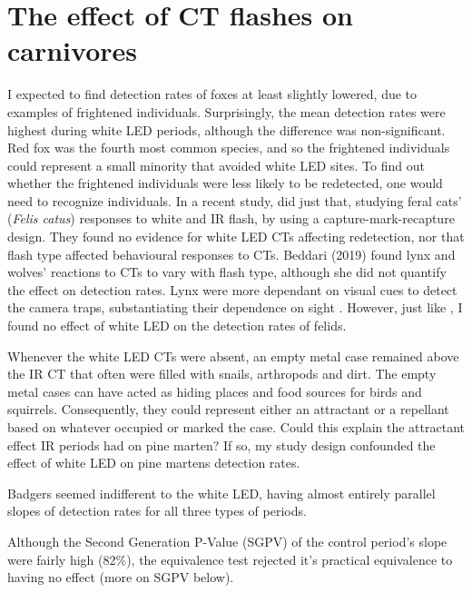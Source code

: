 \section{The effect of CT flashes on carnivores}

I expected to find detection rates of foxes at least slightly lowered, due to examples of frightened individuals. Surprisingly, the mean detection rates were highest during white LED periods, although the difference was non-significant.
Red fox was the fourth most common species, and so the frightened individuals could represent a small minority that avoided white LED sites. To find out whether the frightened individuals were less likely to be redetected, one would need to recognize individuals. %
In a recent study, \textcite{Taggart2020} did just that, studying feral cats' (\textit{Felis catus}) responses to white and IR flash, by using a capture-mark-recapture design.
They found no evidence for white LED CTs affecting redetection, nor that flash type affected behavioural responses to CTs.
Beddari (2019) found lynx and wolves' reactions to CTs to vary with flash type, although she did not quantify the effect on detection rates. Lynx were more dependant on visual cues to detect the camera traps, substantiating their dependence on sight \autocite{Beddari2019}. 
However, just like \textcite{Taggart2020}, I found no effect of white LED on the detection rates of felids. 


Whenever the white LED CTs were absent, an empty metal case remained above the IR CT that often were filled with snails, arthropods and dirt. The empty metal cases can have acted as hiding places and food sources for birds and squirrels. Consequently, they could represent either an attractant or a repellant based on whatever occupied or marked the case.
Could this explain the attractant effect IR periods had on pine marten? If so, my study design confounded the effect of white LED on pine martens detection rates.

Badgers seemed indifferent to the white LED, having almost entirely parallel slopes of detection rates for all three types of periods. 

Although the Second Generation P-Value (SGPV) of the control period's slope were fairly high (82\%), the equivalence test rejected it's practical equivalence to having no effect (more on SGPV below). 


